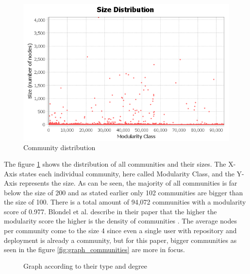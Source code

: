 \begin{figure}[]
    \centering
    \includegraphics[scale=0.8]{graphics/modularity_stats.png}
    \caption{Community distribution}
    \label{fig:community_distribution}
\end{figure}

The figure \ref{fig:community_distribution} shows the distribution of all communities and their sizes. The X-Axis states each individual community, here called Modularity Class, and the Y-Axis represents the size. As can be seen, the majority of all communities is far below the size of 200 and as stated earlier only 102 communities are bigger than the size of 100. There is a total amount of 94,072 communities with a modularity score of 0.977. Blondel et al. describe in their paper that the higher the modularity score the higher is the density of communities \cite{Blondel_2008}. The average nodes per community come to the size 4 since even a single user with repository and deployment is already a community, but for this paper, bigger communities as seen in the figure \ref{fig:graph_communities} are more in focus.

\begin{figure}[]\centering
{}
    \caption{Graph according to their type and degree}
    \label{fig:graph_types}
\end{figure}

